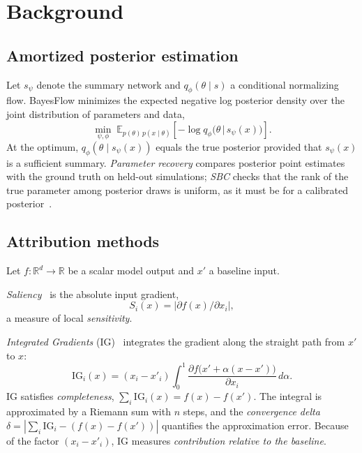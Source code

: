 \documentclass[conference]{IEEEtran}
\newcommand{\IG}{\mathrm{IG}}
\newcommand{\E}{\mathbb{E}}
\begin{document}
\section{Background}

\subsection{Amortized posterior estimation}

Let $s_\psi$ denote the summary network and $q_\phi(\theta\mid s)$ a conditional normalizing flow. BayesFlow
minimizes the expected negative log posterior density over the joint distribution of parameters and data,
\begin{equation}
  \min_{\psi,\phi}\;\E_{p(\theta)\,p(x\mid\theta)}\!\left[-\log q_\phi\big(\theta \,\big|\, s_\psi(x)\big)\right].
  \label{eq:npe}
\end{equation}
At the optimum, $q_\phi(\theta\mid s_\psi(x))$ equals the true posterior provided that $s_\psi(x)$ is a
sufficient summary. \emph{Parameter recovery} compares posterior point estimates with the ground truth on
held-out simulations; \emph{SBC} checks that the rank of the true parameter among posterior draws is uniform,
as it must be for a calibrated posterior~\cite{talts2018sbc}.

\subsection{Attribution methods}

Let $f:\mathbb{R}^d\to\mathbb{R}$ be a scalar model output and $x'$ a baseline input.

\emph{Saliency}~\cite{simonyan2014deep} is the absolute input gradient,
\begin{equation}
  S_i(x) = \left|\partial f(x) / \partial x_i\right|,
\end{equation}
a measure of local \emph{sensitivity}.

\emph{Integrated Gradients} (IG)~\cite{sundararajan2017axiomatic} integrates the gradient along the straight
path from $x'$ to $x$:
\begin{equation}
  \IG_i(x) = (x_i - x'_i)\int_0^1 \frac{\partial f\big(x' + \alpha(x-x')\big)}{\partial x_i}\,d\alpha .
  \label{eq:ig}
\end{equation}
IG satisfies \emph{completeness}, $\sum_i \IG_i(x) = f(x) - f(x')$. The integral is approximated by a Riemann
sum with $n$ steps, and the \emph{convergence delta} $\delta = |\sum_i \IG_i - (f(x)-f(x'))|$ quantifies the
approximation error. Because of the factor $(x_i-x'_i)$, IG measures \emph{contribution relative to the
baseline}.
\end{document}
